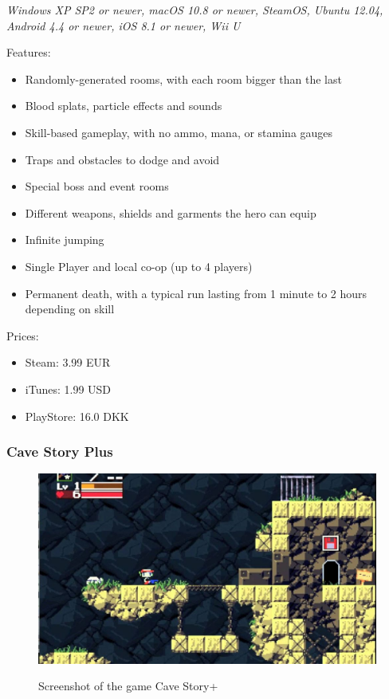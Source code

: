\documentclass[12p]{article}
\begin{document}
\emph{Windows XP SP2 or newer, macOS 10.8 or newer, SteamOS, Ubuntu 12.04, Android 4.4 or newer, iOS 8.1 or newer, Wii U}

Features:

\begin{itemize}
  \item Randomly-generated rooms, with each room bigger than the last
  \item Blood splats, particle effects and sounds
  \item Skill-based gameplay, with no ammo, mana, or stamina gauges
  \item Traps and obstacles to dodge and avoid
  \item Special boss and event rooms
  \item Different weapons, shields and garments the hero can equip
  \item Infinite jumping
  \item Single Player and local co-op (up to 4 players)
  \item Permanent death, with a typical run lasting from 1 minute to 2 hours depending on skill
\end{itemize}

Prices:

\begin{itemize}
  \item Steam: 3.99 EUR
  \item iTunes: 1.99 USD
  \item PlayStore: 16.0 DKK
\end{itemize}


\subsubsection{Cave Story Plus}

\begin{figure}[ht]
  \center
  \includegraphics[width=1\textwidth]{StateOfTheArtScreenshots/cave_story_plus}
  \label{StateOfTheArt_Screenshots_CaveStoryPlus}
  \caption{Screenshot of the game Cave Story+ \cite{CaveStoryPlusScreenshot}}
\end{figure}
\end{document}
